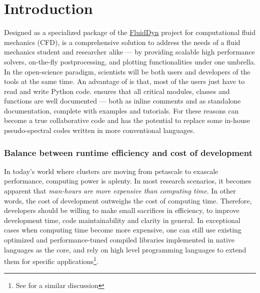\documentclass{../jors}
\begin{document}
\section*{Introduction}


Designed as a specialized package of the
\href{https://fluiddyn.readthedocs.io}{FluidDyn} project for computational fluid
mechanics (CFD),  is a comprehensive solution to address the needs
of a fluid mechanics student and researcher alike --- by providing scalable high
performance solvers, on-the-fly postprocessing, and plotting functionalities under
one umbrella.  In the open-science paradigm, scientists will be both users and
developers of the tools at the same time.
%
An advantage of  is that, most of the users just have to read and
write Python code.   ensures that all critical modules, classes and
functions are well documented --- both as inline comments and as standalone
documentation, complete with examples and tutorials.  For these reasons
 can become a true collaborative code and has the potential to
replace some in-house pseudo-spectral codes written in more conventional
languages.

\subsubsection*{Balance between runtime efficiency and cost of development}
In today's world where clusters are moving from petascale to exascale
performance, computing power is aplenty. In most research scenarios, it becomes
apparent that \emph{man-hours are more expensive than computing time}. In other
words, the cost of development outweighs the cost of computing time. Therefore,
developers should be willing to make small sacrifices in efficiency, to improve
development time, code maintainability and clarity in general. In exceptional
cases when computing time become more expensive, one can still use
existing optimized and performance-tuned compiled libraries implemented in
native languages as the core, and rely on high level programming languages to
extend them for specific applications\footnote{See
  \citet{ramachandran_pysph_2016} for a similar discussion}.
\end{document}
